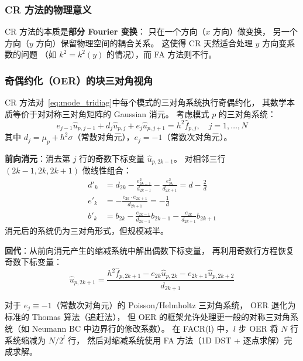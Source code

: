 \subsubsection{CR 方法的物理意义}

CR 方法的本质是\textbf{部分 Fourier 变换}：
只在一个方向（$x$ 方向）做变换，
另一个方向（$y$ 方向）保留物理空间的耦合关系。
这使得 CR 天然适合处理 $y$ 方向变系数的问题
（如 $k^2 = k^2(y)$ 的情况），而 FA 方法则不行。

\subsubsection{奇偶约化（OER）的块三对角视角}

CR 方法对~\eqref{eq:mode_tridiag}中每个模式的三对角系统执行奇偶约化，
其数学本质等价于对对称三对角矩阵的 Gaussian 消元。
考虑模式 $p$ 的三对角系统：
\begin{equation}
  e_{j-1}\hat{u}_{p,j-1} + d_j\hat{u}_{p,j} + e_j\hat{u}_{p,j+1} = h^2\hat{f}_{p,j}, \quad j = 1, \ldots, N
  \label{eq:tridiag_general}
\end{equation}
其中 $d_j = \mu_p + h^2 \sigma$（常数对角元），$e_j = -1$（常数次对角元）。

\textbf{前向消元}：消去第 $j$ 行的奇数下标变量 $\hat{u}_{p,2k-1}$。
对相邻三行 $(2k-1, 2k, 2k+1)$ 做线性组合：
\begin{align}
  d'_k &= d_{2k} - \frac{e_{2k-1}^2}{d_{2k-1}} - \frac{e_{2k}^2}{d_{2k+1}}
  = d - \frac{2}{d}
  \label{eq:cr_diag} \\
  e'_k &= -\frac{e_{2k} \cdot e_{2k+1}}{d_{2k+1}}
  = -\frac{1}{d}
  \label{eq:cr_offdiag} \\
  b'_k &= b_{2k} - \frac{e_{2k-1}}{d_{2k-1}}b_{2k-1} - \frac{e_{2k}}{d_{2k+1}}b_{2k+1}
  \label{eq:cr_rhs}
\end{align}
消元后的系统仍为三对角形式，但规模减半。

\textbf{回代}：从前向消元产生的缩减系统中解出偶数下标变量，
再利用奇数行方程恢复奇数下标变量：
\begin{equation}
  \hat{u}_{p,2k+1} = \frac{h^2\hat{f}_{p,2k+1} - e_{2k}\hat{u}_{p,2k} - e_{2k+1}\hat{u}_{p,2k+2}}{d_{2k+1}}
  \label{eq:cr_backsub}
\end{equation}

\begin{remark}
  对于 $e_j \equiv -1$（常数次对角元）的 Poisson/Helmholtz 三对角系统，
  OER 退化为标准的 Thomas 算法（追赶法），
  但 OER 的框架允许处理更一般的对称三对角系统（如 Neumann BC 中边界行的修改系数）。
  在 FACR(l) 中，$l$ 步 OER 将 $N$ 行系统缩减为 $N/2^l$ 行，
  然后对缩减系统使用 FA 方法（1D DST + 逐点求解）完成求解。
\end{remark}

